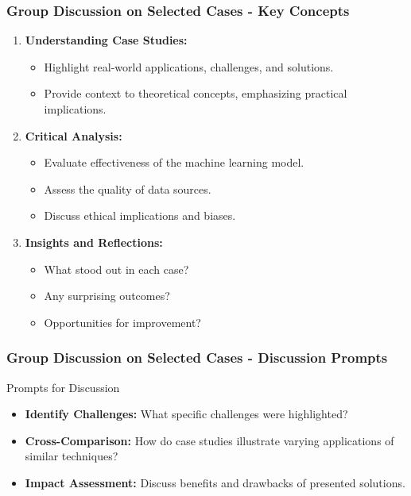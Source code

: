 \documentclass[aspectratio=169]{beamer}
\begin{document}
\begin{frame}[fragile]
    \frametitle{Group Discussion on Selected Cases - Key Concepts}
    \begin{enumerate}
        \item \textbf{Understanding Case Studies:}
        \begin{itemize}
            \item Highlight real-world applications, challenges, and solutions.
            \item Provide context to theoretical concepts, emphasizing practical implications.
        \end{itemize}

        \item \textbf{Critical Analysis:}
        \begin{itemize}
            \item Evaluate effectiveness of the machine learning model.
            \item Assess the quality of data sources.
            \item Discuss ethical implications and biases.
        \end{itemize}

        \item \textbf{Insights and Reflections:}
        \begin{itemize}
            \item What stood out in each case?
            \item Any surprising outcomes?
            \item Opportunities for improvement?
        \end{itemize}
    \end{enumerate}
\end{frame}

\begin{frame}[fragile]
    \frametitle{Group Discussion on Selected Cases - Discussion Prompts}
    \begin{block}{Prompts for Discussion}
        \begin{itemize}
            \item \textbf{Identify Challenges:} What specific challenges were highlighted?
            \item \textbf{Cross-Comparison:} How do case studies illustrate varying applications of similar techniques?
            \item \textbf{Impact Assessment:} Discuss benefits and drawbacks of presented solutions.
        \end{itemize}
    \end{block}
\end{frame}
\end{document}
